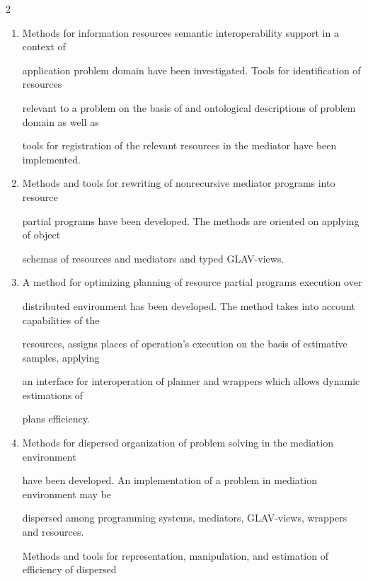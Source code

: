 \begin{multicols}{2}





\begin{enumerate}[1.]


\addtocounter{enumi}{2}


\item Methods for information resources semantic interoperability support in a context of 


application problem domain have been investigated. Tools for identification of resources 


relevant to a problem on the basis of and ontological descriptions of problem domain as well as 


tools for registration of the relevant resources in the mediator have been implemented.\\[-9pt]


\item Methods and tools for rewriting of nonrecursive mediator programs into resource 


partial programs have been developed. The methods are oriented on applying of object 


schemas of resources and mediators and typed GLAV-views.\\[-9pt]


\item A method for optimizing planning of resource partial programs execution over 


distributed environment has been developed. The method takes into account capabilities of the 


resources, assigns places of operation's execution on the basis of estimative samples, applying 


an interface for interoperation of planner and wrappers which allows dynamic estimations of 


plans efficiency.\\[-10pt]


\item Methods for dispersed organization of problem solving in the mediation environment 


have been developed. An implementation of a problem in mediation environment may be 


dispersed among programming systems, mediators, GLAV-views, wrappers and resources. 


Methods and tools for representation, manipulation, and estimation of efficiency of dispersed 



\end{enumerate}
\end{multicols}
